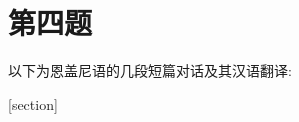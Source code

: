 \section{第四题}

\def \oldman {老汉}
\def \man {男人}
\def \young {青年}
\def \child {儿童}
\def \woman {女人}
\def \girl {姑娘}
\def \thief {小偷}
\def \pig {猪}

\def \frighten {吓到}
\def \resemble {长得像}
\def \kill {杀}
\def \heal {治好}

\def \deceived {受骗}
\def \beaten {挨了打}
\def \evil {邪恶}
\def \coughing {咳嗽}

\def \null {null}
\newcommand \refer [2]{#1$_{\mbox{\tiny{#2}}}$}
\newcommand \getGender [1]{\ifx#1\woman 她\else\ifx#1\girl 她\else 他\fi\fi}
\newcommand \getPastTense [1]{\ifx#1\resemble 长 (过去时) 得像\else #1了\fi}
\newcommand \getFutureTense [1]{会 (将来时) #1}
\newcommand \notPastTense [1]{\ifx#1\resemble 长 (过去时) 得不像\else 没有#1\fi}
\newcommand \notFutureTense [1]{不会 (将来时) #1}
\newcommand \verbGen [2]{\ifcase #1\or \getPastTense{#2}\or 
\getFutureTense{#2}\or \notPastTense{#2}\or \notFutureTense{#2}\fi}
\newcommand \getPeople [3]{\ifx#2\null [这]\else 这一个\fi\ifx#3\null \else #3的\fi#1}
\newcommand \genHans [8]{\getPeople{#1}{#2}{#3}\verbGen{#4}{#6}#7吗?\\
\ifx#8\null \getPeople{#1}{#2}{#3}\else #8\fi
说\refer{\getGender{#1}}{\getPeople{#1}{#2}{#3}}\verbGen{#5}{#6}#7.}

\newcommand \didial [3]{\bipa{#1?} \bipa{#2.}\\#3}

以下为恩盖尼语的几段短篇对话及其汉语翻译:

[section]

